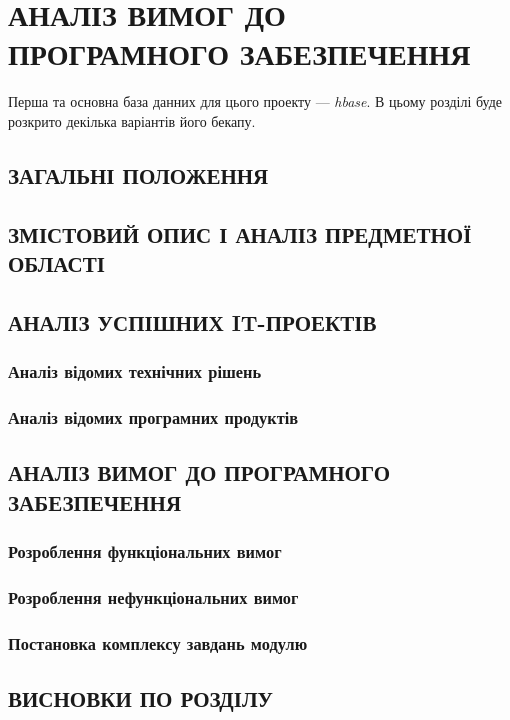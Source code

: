 
\chapter{АНАЛІЗ ВИМОГ ДО ПРОГРАМНОГО ЗАБЕЗПЕЧЕННЯ}

Перша та основна база данних для цього проекту --- \textit{hbase}. В цьому розділі буде розкрито декілька варіантів його бекапу.

\section{ЗАГАЛЬНІ ПОЛОЖЕННЯ}

\section{ЗМІСТОВИЙ ОПИС І АНАЛІЗ ПРЕДМЕТНОЇ ОБЛАСТІ}

\section{АНАЛІЗ УСПІШНИХ IT-ПРОЕКТІВ}
\subsection{Аналіз відомих технічних рішень}
\subsection{Аналіз відомих програмних продуктів}

\section{АНАЛІЗ ВИМОГ ДО ПРОГРАМНОГО ЗАБЕЗПЕЧЕННЯ}
\subsection{Розроблення функціональних вимог}
\subsection{Розроблення нефункціональних вимог}
\subsection{Постановка комплексу завдань модулю}

\section{ВИСНОВКИ ПО РОЗДІЛУ}


